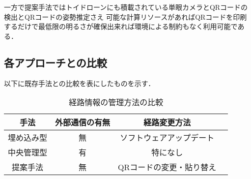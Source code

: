 一方で提案手法ではトイドローンにも積載されている単眼カメラとQRコードの検出とQRコードの姿勢推定さえ
可能な計算リソースがあればQRコードを印刷するだけで最低限の明るさが確保出来れば環境による制約もなく利用可能である．

\subsection{各アプローチとの比較}
以下に既存手法との比較を表にしたものを示す．

\begin{table}[h]
    \caption{各自己位置推定手法との比較}
    \label{table:compare_localization}
    \centering
\end{table}

\begin{table}[h]
    \caption{経路情報の管理方法の比較}
    \label{table:compare_route_info}
    \centering
    \begin{tabular}{cccc}
        \hline
        手法 & 外部通信の有無 & 経路変更方法   \\
        \hline \hline
        埋め込み型 & 無 & ソフトウェアアップデート \\
        中央管理型 & 有 & 特になし   \\
        提案手法 & 無 & QRコードの変更・貼り替え   \\
        \hline
    \end{tabular}
\end{table}
